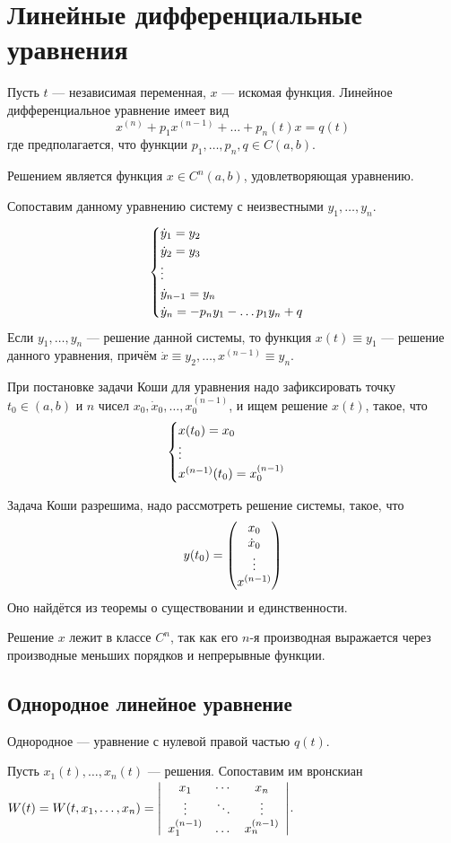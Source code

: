 \documentclass[a4paper]{report}
\begin{document}
    \chapter{Линейные дифференциальные уравнения}
    Пусть $t$ --- независимая переменная, $x$ --- искомая функция.
    Линейное дифференциальное уравнение имеет вид
    \[x^{(n)} + p_1x^{(n - 1)} + \dots + p_n(t)x = q(t)\]
    где предполагается, что функции $p_1, \dots, p_n, q \in C(a, b)$.

    Решением является функция $x \in C^n(a, b)$, удовлетворяющая уравнению.

    Сопоставим данному уравнению систему с неизвестными $y_1, \dots, y_n$.
    \[\all{\dot{y}_1 = y_2 \\\dot{y}_2 = y_3 \\ \vdots \\ \dot{y}_{n - 1} = y_n \\ \dot{y}_n = -p_n y_1 - \dots p_1 y_n + q}\]
    Если $y_1, \dots, y_n$ --- решение данной системы, то функция $x(t) \equiv y_1$ --- решение данного уравнения, причём $\dot{x} \equiv y_2, \dots, x^{(n - 1)} \equiv y_{n}$.

    При постановке задачи Коши для уравнения надо зафиксировать точку $t_0 \in (a, b)$ и $n$ чисел $x_0, \dot{x}_0, \dots, x^{(n - 1)}_0$, и ищем решение $x(t)$, такое, что
    \[\all{x(t_0) = x_0 \\ \vdots \\ x^{(n - 1)}(t_0) = x_0^{(n - 1)}}\]

    Задача Коши разрешима, надо рассмотреть решение системы, такое, что
    \[y(t_0) = \vect{x_0 \\ \dot{x}_0 \\ \vdots \\ x^{(n - 1)}}\]
    Оно найдётся из теоремы о существовании и единственности.

    Решение $x$ лежит в классе $C^n$, так как его $n$-я производная выражается через производные меньших порядков и непрерывные функции.


    \section{Однородное линейное уравнение}
    Однородное --- уравнение с нулевой правой частью $q(t)$.


    Пусть $x_1(t), \dots, x_n(t)$ --- решения.
    Сопоставим им вронскиан $W(t) = W(t, x_1, \dots, x_n) = \abs{\arr{ccc}{x_1 & \cdots & x_n \\ \vdots & \ddots & \vdots \\ x_1^{(n - 1)} & \dots & x_n^{(n - 1)}}}$.
\end{document}
